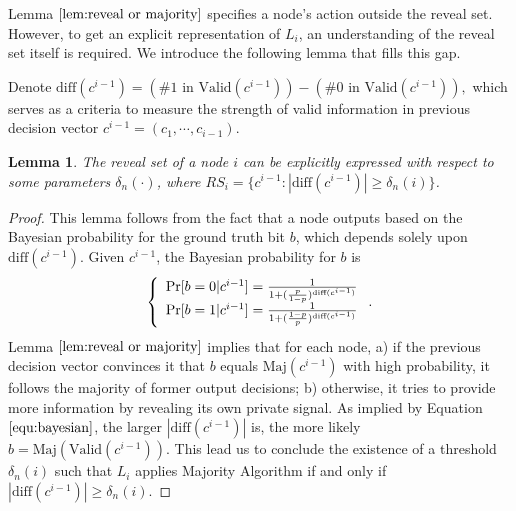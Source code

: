 \documentclass[a4paper,UKenglish]{lipics}
\newtheorem{lem}[thm]{Lemma}
\theoremstyle{definition}
\newcommand{\Maj}{\text{Maj}}
\newcommand{\diff}{\text{diff}}
\begin{document}
Lemma $\ref{lem:reveal or majority}$ specifies a node's action outside the reveal set.
However, to get an explicit representation of $L_i$, an understanding of the reveal set itself is required.
We introduce the following lemma that fills this gap.


Denote
$
	\diff(c^{i-1}) 
	= 
	(\text{\# 1 in }\text{Valid}(c^{i-1})) - (\text{\# 0 in }\text{Valid}(c^{i-1})),
$
which serves as a criteria to measure the strength of valid information in previous decision vector $c^{i-1} = (c_1, \dotsb, c_{i-1})$.

\begin{lem}
\label{lem:reveal set threshold}
The reveal set of a node $i$ can be explicitly expressed with respect to some parameters $\delta_n(\cdot)$, where
	$RS_i = \{ c^{i-1} :|\diff(c^{i-1})| \ge \delta_n(i) \}$.
\end{lem}
\begin{proof}
This lemma follows from the fact that a node outputs based on the Bayesian probability for the ground truth bit $b$,
	which depends solely upon $\diff(c^{i-1})$.
Given $c^{i-1}$, the Bayesian probability for $b$ is 
\begin{equation}
\label{equ:bayesian}
\left\{
\begin{array} {l}
	\Pr[b = 0|c^{i-1}]
	=\frac{1}{1 + ({p\over 1-p})^{\diff(c^{i-1})}}
\\
	\Pr[b = 1|c^{i-1}] 
	= \frac{1}{1 + ({1 - p\over p})^{\diff(c^{i-1})}}
\end{array}
\right..
\end{equation}
Lemma $\ref{lem:reveal or majority}$ implies that for each node,
	a) if the previous decision vector convinces it that $b$ equals $\Maj(c^{i-1})$ with high probability, 
		it follows the majority of former output decisions;
	b) otherwise, it tries to provide more information by revealing its own private signal.
As implied by Equation $\eqref{equ:bayesian}$, the larger $|\diff(c^{i-1})|$ is, the more likely $b = \Maj(\text{Valid}(c^{i-1}))$. 
This lead us to conclude the existence of a threshold $\delta_n(i)$ such that $L_i$ applies Majority Algorithm if and only if $|\diff(c^{i-1})| \ge \delta_n(i)$. 
\end{proof}
\end{document}
